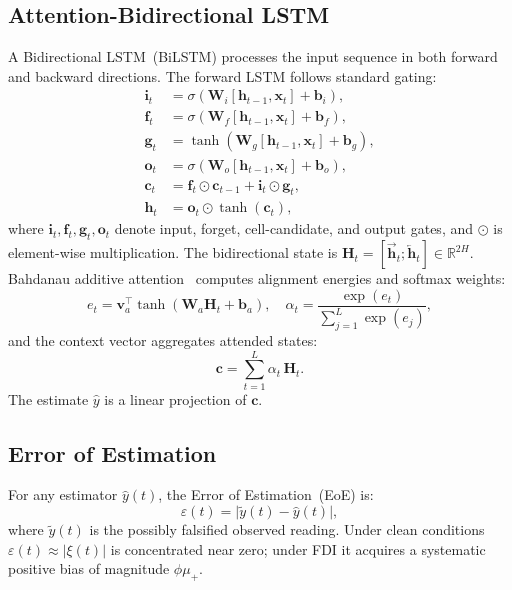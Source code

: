 \documentclass[journal]{IEEEtran}
\begin{document}
\subsection{Attention-Bidirectional LSTM}

A Bidirectional LSTM~(BiLSTM) processes the input sequence
in both forward and backward directions.
The forward LSTM follows standard gating:
\begin{align}
  \mathbf{i}_t &= \sigma(\mathbf{W}_i[\mathbf{h}_{t-1},\mathbf{x}_t]+\mathbf{b}_i),
  \label{eq:gate_i}\\
  \mathbf{f}_t &= \sigma(\mathbf{W}_f[\mathbf{h}_{t-1},\mathbf{x}_t]+\mathbf{b}_f),
  \label{eq:gate_f}\\
  \mathbf{g}_t &= \tanh(\mathbf{W}_g[\mathbf{h}_{t-1},\mathbf{x}_t]+\mathbf{b}_g),
  \label{eq:gate_g}\\
  \mathbf{o}_t &= \sigma(\mathbf{W}_o[\mathbf{h}_{t-1},\mathbf{x}_t]+\mathbf{b}_o),
  \label{eq:gate_o}\\
  \mathbf{c}_t &= \mathbf{f}_t\odot\mathbf{c}_{t-1}
                   +\mathbf{i}_t\odot\mathbf{g}_t,
  \label{eq:cell}\\
  \mathbf{h}_t &= \mathbf{o}_t\odot\tanh(\mathbf{c}_t),
  \label{eq:hstate}
\end{align}
where $\mathbf{i}_t,\mathbf{f}_t,\mathbf{g}_t,\mathbf{o}_t$
denote input, forget, cell-candidate, and output gates, and
$\odot$ is element-wise multiplication.
The bidirectional state is
$\mathbf{H}_t =
[\overrightarrow{\mathbf{h}}_t;\overleftarrow{\mathbf{h}}_t]
\in\mathbb{R}^{2H}$.
Bahdanau additive attention~\cite{bahdanau2015} computes
alignment energies and softmax weights:
\begin{equation}
  e_t = \mathbf{v}_a^\top\tanh(\mathbf{W}_a\mathbf{H}_t + \mathbf{b}_a),
  \quad
  \alpha_t = \frac{\exp(e_t)}{\displaystyle\sum_{j=1}^{L}\exp(e_j)},
  \label{eq:attention}
\end{equation}
and the context vector aggregates attended states:
\begin{equation}
  \mathbf{c} = \sum_{t=1}^{L}\alpha_t\,\mathbf{H}_t.
  \label{eq:context}
\end{equation}
The estimate $\hat{y}$ is a linear projection of $\mathbf{c}$.

\subsection{Error of Estimation}

For any estimator $\hat{y}(t)$, the Error of Estimation~(EoE) is:
\begin{equation}
  \varepsilon(t) = \bigl|\tilde{y}(t) - \hat{y}(t)\bigr|,
  \label{eq:eoe}
\end{equation}
where $\tilde{y}(t)$ is the possibly falsified observed reading.
Under clean conditions $\varepsilon(t)\approx|\xi(t)|$ is
concentrated near zero; under FDI it acquires a systematic
positive bias of magnitude $\phi\mu_+$.
\end{document}

